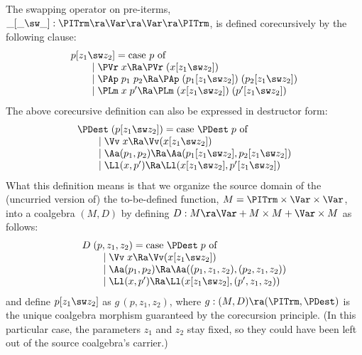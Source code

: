 \medskip
The swapping operator on pre-iterms, $\_[\_\sw\_] : \PITrm \ra \Var \ra \Var \ra \PITrm$, is defined corecursively by the following clause:
$$
\begin{array}{l}
p[z_1 \sw z_2] = \mbox{case $p$ of}
\\
\hspace*{5ex}\mid \PVr\;x \Ra \PVr\;(x[z_1\sw z_2]) 
\\
\hspace*{5ex}\mid \PAp\;p_1\;p_2 \Ra \PAp\;(p_1[z_1\sw z_2]) \;(p_2[z_1\sw z_2]) 
\\
\hspace*{5ex}\mid \PLm\;x\;p' \Ra \PLm\;(x[z_1\sw z_2]) \;(p'[z_1\sw z_2]) 
\end{array} 
$$
%
The above corecursive definition can also be expressed in destructor form:
%
$$
\begin{array}{l}
\PDest\;(p[z_1 \sw z_2]) = \mbox{case $\PDest\;p$ of}
\\
\hspace*{5ex}\mid \Vv\;x \Ra \Vv (x[z_1\sw z_2]) 
\\
\hspace*{5ex}\mid \Aa(p_1,p_2) \Ra \Aa(p_1[z_1\sw z_2],p_2[z_1\sw z_2]) 
\\
\hspace*{5ex}\mid \Ll(x,p') \Ra \Ll(x[z_1\sw z_2], p'[z_1\sw z_2]) 
\end{array} 
$$
What this definition means is that %
we organize the source domain of the (uncurried version of) the to-be-defined function, $M = \PITrm \times \Var \times \Var$, into a coalgebra $(M,D)$ by defining $D : M \ra \Var + M \times M + \Var\times M$ as follows: 
$$
\begin{array}{l}
D\;(p,z_1,z_2) = \mbox{case $\PDest\;p$ of}
\\
\hspace*{5ex}\mid \Vv\;x \Ra \Vv (x[z_1\sw z_2]) 
\\
\hspace*{5ex}\mid \Aa(p_1,p_2) \Ra \Aa((p_1,z_1,z_2),(p_2,z_1,z_2)) 
\\
\hspace*{5ex}\mid \Ll(x,p') \Ra \Ll(x[z_1\sw z_2],(p',z_1,z_2)) 
\end{array} 
$$
and define $p[z_1\sw z_2]$ as $g\,(p,z_1,z_2)$, where $g: (M,D) \ra (\PITrm,\PDest)$ is the unique coalgebra morphism guaranteed by the corecursion principle.
(In this particular case, the parameters $z_1$ and $z_2$ stay fixed, so they could have been left out 
of the source coalgebra's carrier.)

